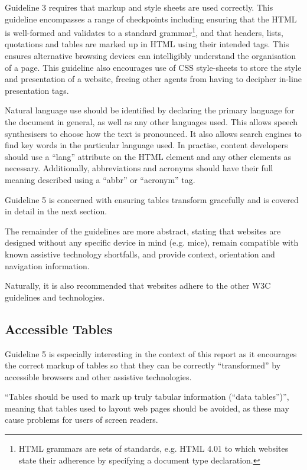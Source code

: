 Guideline 3 requires that markup and style sheets are used correctly. This
guideline encompasses a range of checkpoints including ensuring that the HTML
is well-formed and validates to a standard grammar\footnote{HTML grammars are
sets of standards, e.g. HTML 4.01 to which websites state their adherence by
specifying a document type declaration.}, and that headers, lists, quotations
and tables are marked up in HTML using their intended tags. This ensures
alternative browsing devices can intelligibly understand the organisation of a
page. This guideline also encourages use of CSS style-sheets to store the
style and presentation of a website, freeing other agents from having to
decipher in-line presentation tags.

Natural language use should be identified by declaring the primary language for
the document in general, as well as any other languages used. This allows
speech synthesisers to choose how the text is pronounced. It also allows search
engines to find key words in the particular language used. In practise, content
developers should use a ``lang'' attribute on the HTML element and any other
elements as necessary. Additionally, abbreviations and acronyms should have
their full meaning described using a ``abbr'' or ``acronym'' tag.

Guideline 5 is concerned with ensuring tables transform gracefully and is 
covered in detail in the next section.

The remainder of the guidelines are more abstract, stating that websites are
designed without any specific device in mind (e.g. mice), remain compatible
with known assistive technology shortfalls, and provide context, orientation
and navigation information. 

Naturally, it is also recommended that websites adhere to the other W3C
guidelines and technologies.

\subsection{Accessible Tables}

Guideline 5 is especially interesting in the context of this report as it
encourages the correct markup of tables so that they can be correctly
``transformed'' by accessible browsers and other assistive technologies.

``Tables should be used to mark up truly tabular information (``data
tables'')''\cite{w3c:wcag}, meaning that tables used to layout web
pages should be avoided, as these may cause problems for users of
screen readers.

